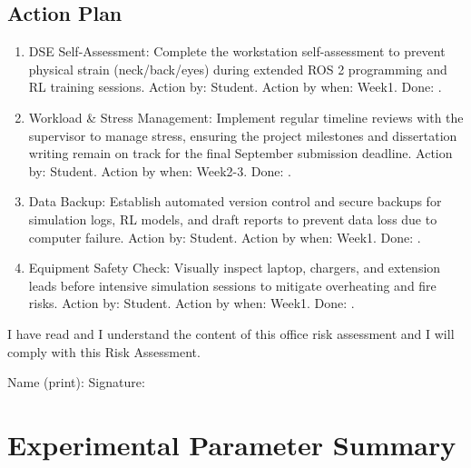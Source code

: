 \begin{uomappendix}
{\subsection*{Action Plan}

\begin{enumerate}[leftmargin=*]
\item DSE Self-Assessment: Complete the workstation self-assessment to prevent physical strain (neck/back/eyes) during extended ROS 2 programming and RL training sessions. Action by: Student. Action by when: Week1. Done: .
\item Workload \& Stress Management: Implement regular timeline reviews with the supervisor to manage stress, ensuring the project milestones and dissertation writing remain on track for the final September submission deadline. Action by: Student. Action by when: Week2-3. Done: .
\item Data Backup: Establish automated version control and secure backups for simulation logs, RL models, and draft reports to prevent data loss due to computer failure. Action by: Student. Action by when: Week1. Done: .
\item Equipment Safety Check: Visually inspect laptop, chargers, and extension leads before intensive simulation sessions to mitigate overheating and fire risks. Action by: Student. Action by when: Week1. Done: .
\end{enumerate}

I have read and I understand the content of this office risk assessment and I will comply with this Risk Assessment.

Name (print): \hfill Signature: \hfill
}

\section{Experimental Parameter Summary}


\end{uomappendix}
